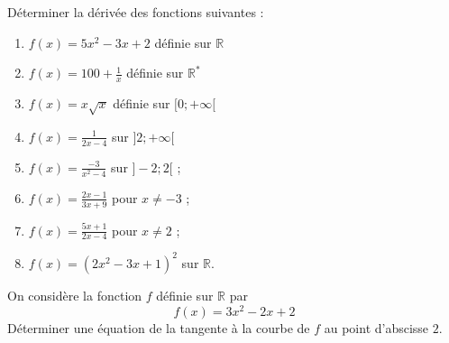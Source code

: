 \documentclass[1,exos,b,prof,e]{phBook}
\begin{document}
\begin{exercice}
	Déterminer la dérivée des fonctions suivantes :
	\begin{enumerate}
		\item $f(x)=5 x^2-3 x+2$ définie sur $\mathbb{R}$
		\item $f(x)= 100+\frac{1}{x}$ définie sur $\mathbb{R}^*$
		\item $f(x)= x \sqrt{x}$ définie sur $[0 ;+\infty[$
		\item $f\left(x\right)=\frac{1}{2x-4}$ sur $]2;+\infty[$
		\item $f(x)=\frac{-3}{x^2-4}$ sur $]-2;2[$ ;
		\item $f\left(x\right)=\frac{2x-1}{3x+9}$ pour $x\neq-3$ ;
		\item $f(x)=\frac{5x+1}{2x-4}$ pour $x\neq 2$ ;
		\item $f\left(x\right)=\left(2x^{2}-3x+1\right)^{2}$ sur $\mathbb{R}$.
	\end{enumerate}



\end{exercice}





\begin{exercice}
    On considère la fonction $f$ définie sur $\mathbb{R}$ par 
    \[f\left(x\right)=3x^{2}-2x+2\]
    Déterminer une équation de la tangente à la courbe de $f$ au point d'abscisse $2$.



\end{exercice}
    
\end{document}
